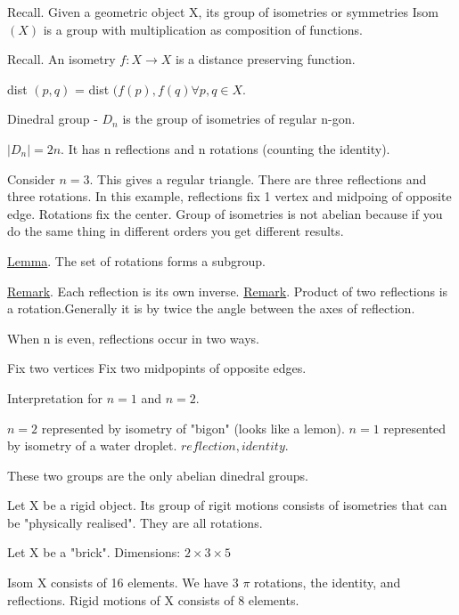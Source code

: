 \documentclass[class=scrartcl, crop=false]{standalone}
\begin{document}
Recall. Given a geometric object X, its group of isometries or symmetries Isom$(X)$ is a group with multiplication as composition of functions.

Recall. An isometry $f: X \to X$ is a distance preserving function.

dist $(p, q)$ = dist $(f(p), f(q) \forall p, q \in X$.

\begin{definition}
  Dinedral group - $D_n$ is the group of isometries of regular n-gon.
  \begin{example}
    $|D_n| = 2n$. It has n reflections and n rotations (counting the identity).

    Consider $n = 3$. This gives a regular triangle. There are three reflections and three rotations. In this example, reflections fix 1 vertex and midpoing of opposite edge. Rotations fix the center. Group of isometries is not abelian because if you do the same thing in different orders you get different results.
  \end{example}
\end{definition}

\ul{Lemma}. The set of rotations forms a subgroup.

\ul{Remark}. Each reflection is its own inverse.
\ul{Remark}. Product of two reflections is a rotation.Generally it is by twice the angle between the axes of reflection.

When n is even, reflections occur in two ways.
\begin{enumerate}
  \ii
  Fix two vertices
  \ii
  Fix two midpopints of opposite edges.
\end{enumerate}

Interpretation for $n = 1$ and $n = 2$.
\begin{enumerate}
  \ii
  $n = 2$ represented by isometry of "bigon" (looks like a lemon). 
  \ii
  $n = 1$ represented by isometry of a water droplet. $reflection, identity$.
\end{enumerate}
These two groups are the only abelian dinedral groups.

Let X be a rigid object. Its group of rigit motions consists of isometries that can be "physically realised". They are all rotations.

\begin{example}
  Let X be a "brick". Dimensions: $2 \times 3 \times 5$
  \begin{enumerate}
    \ii
    Isom X consists of 16 elements. We have 3 $\pi$ rotations, the identity, and reflections.
    \ii
    Rigid motions of X consists of 8 elements.
  \end{enumerate}
\end{example}
\end{document}
